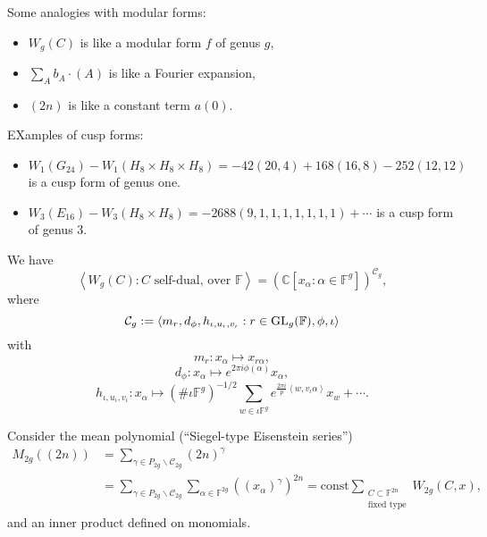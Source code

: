 \documentclass[reqno]{amsart} 
\begin{document}
Some analogies with modular forms:
\begin{itemize}
\item $W_g(C)$ is like a modular form $f$ of genus $g$,
\item $\sum_A b_A \cdot(A)$ is like a Fourier expansion,
\item $(2 n)$ is like a constant term $a(0)$.
\end{itemize}
EXamples of cusp forms:
\begin{itemize}
\item $W_1(G_{24}) - W_1(H_8 \times H_8 \times H_8)
  = - 42(20, 4) + 168(16, 8) - 252(12, 12)$ is a cusp form of genus one.
\item $W_3(E_{16}) - W_3(H_8 \times H_8) = - 2688(9, 1, 1, 1, 1, 1, 1, 1) + \dotsb$ is a cusp form of genus $3$.
\end{itemize}

\begin{theorem}
  We have
  \begin{equation*}
    \left\langle W_g(C) : \text{$C$ self-dual, over $\mathbb{F}$} \right\rangle
    =
    \left( \mathbb{C}[x_\alpha : \alpha \in \mathbb{F}^g] \right)^{\mathcal{C}_g},
  \end{equation*}
  where
  \begin{equation*}
    \mathcal{C}_g := \left\langle m_r, d_\phi, h_{\iota, u_{\iota}, v_{\iota}} : r \in \operatorname{GL}_g(\mathbb{F}), \phi, \iota \right\rangle
  \end{equation*}
  with
  \begin{equation*}
    m_r : x_\alpha \mapsto x_{r \alpha},
  \end{equation*}
  \begin{equation*}
    d_\phi : x_\alpha \mapsto e^{2 \pi i \phi(\alpha)} x_\alpha,
  \end{equation*}
  \begin{equation*}
    h_{\iota, u_\iota, v_\iota}
    : x_\alpha \mapsto \left( \# \iota \mathbb{F}^g \right)^{- 1/2}
    \sum_{w \in \iota \mathbb{F}^g}
    e^{\frac{2 \pi i}{p} \left\langle w, v_\iota \alpha \right\rangle} x_w + \dotsb.
  \end{equation*}
\end{theorem}
Consider the mean polynomial (``Siegel-type Eisenstein series'')
\begin{align*}
  M_{2 g}((2 n)) &= \sum_{\gamma \in P_{2 g} \backslash \mathcal{C}_{2 g}}
  (2 n)^\gamma
  \\
  &=
  \sum_{\gamma \in P_{2 g} \backslash \mathcal{C}_{2 g}} \sum_{\alpha \in \mathbb{F}^{2 g}}
  \left((x_\alpha)^\gamma \right)^{2 n}
  = \mathrm{const} \sum_{
    \substack{
      C \subset \mathbb{F}^{2 n}  \\
      \text{fixed type}
    }
  }
  W_{2 g}(C, x),
\end{align*}
and an inner product defined on monomials.
\end{document}
